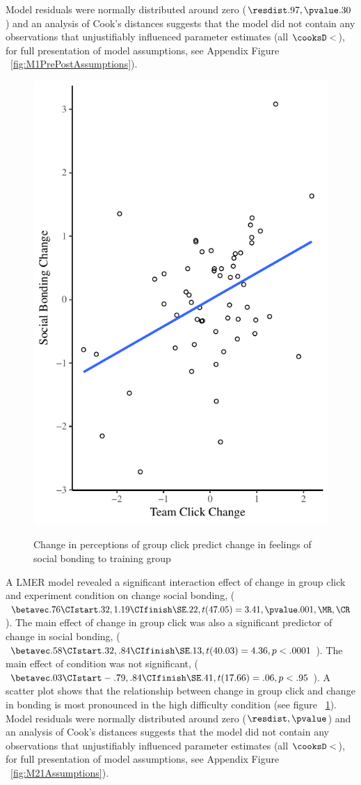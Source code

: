 Model residuals were normally distributed around zero ($\resdist .97 , \pvalue .30$) and an analysis of Cook's distances suggests that the model did not contain any observations that unjustifiably influenced parameter estimates (all $\cooksD < $), for full presentation of model assumptions, see Appendix Figure ~\ref{fig:M1PrePostAssumptions}).






\begin{figure}
  \centering
    \includegraphics[width=0.5\linewidth,keepaspectratio] {images/groupClickBondingChangeCondition}
    \label{fig:groupClickBondingChangeCondition}
    \caption{Change in perceptions of group click predict change in feelings of social bonding to training group}
\end{figure}

A LMER model revealed a significant interaction effect of change in group click and experiment condition on change social bonding, ($\betavec .76 \CIstart .32, 1.19 \CIfinish \SE.22, t(47.05) = 3.41, \pvalue .001, \MR , \CR $).  The main effect of change in group click was also a significant predictor of change in social bonding, ($\betavec .58 \CIstart .32, .84 \CIfinish \SE.13, t(40.03) = 4.36, p < .0001 $).  The main effect of condition was not significant, ($\betavec .03 \CIstart -.79, .84 \CIfinish \SE.41, t(17.66) = .06, p < .95 $).  A scatter plot shows that the relationship between change in group click and change in bonding is most pronounced in the high difficulty condition (see figure ~\ref{fig:groupClickBondingChangeCondition}). Model residuals were normally distributed around zero ($\resdist , \pvalue $) and an analysis of Cook's distances suggests that the model did not contain any observations that unjustifiably influenced parameter estimates (all $\cooksD < $), for full presentation of model assumptions, see Appendix Figure ~\ref{fig:M21Assumptions}).

